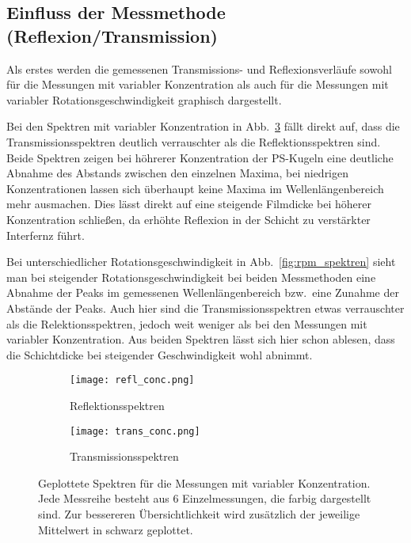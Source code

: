 \subsection{Einfluss der Messmethode (Reflexion/Transmission) \label{sec:einflussmethode}}

Als erstes werden die gemessenen Transmissions- und Reflexionsverläufe sowohl für die Messungen mit variabler Konzentration als auch für die Messungen mit variabler Rotationsgeschwindigkeit graphisch dargestellt. 

Bei den Spektren mit variabler Konzentration in Abb.~\ref{fig:conc_spektren} fällt direkt auf, dass die Transmissionsspektren deutlich verrauschter als die Reflektionsspektren sind. Beide Spektren zeigen bei höhrerer Konzentration der PS-Kugeln eine deutliche Abnahme des Abstands zwischen den einzelnen Maxima, bei niedrigen Konzentrationen lassen sich überhaupt keine Maxima im Wellenlängenbereich mehr ausmachen. Dies lässt direkt auf eine steigende Filmdicke bei höherer Konzentration schließen, da erhöhte Reflexion in der Schicht zu verstärkter Interfernz führt.

Bei unterschiedlicher Rotationsgeschwindigkeit in Abb.~\ref{fig:rpm_spektren} sieht man bei steigender Rotationsgeschwindigkeit bei beiden Messmethoden eine Abnahme der Peaks im gemessenen Wellenlängenbereich bzw.~eine Zunahme der Abstände der Peaks. Auch hier sind die Transmissionsspektren etwas verrauschter als die Relektionsspektren, jedoch weit weniger als bei den Messungen mit variabler Konzentration. Aus beiden Spektren lässt sich hier schon ablesen, dass die Schichtdicke bei steigender Geschwindigkeit wohl abnimmt.

\begin{figure}[h!]
    \centering
    \begin{subfigure}{.5\textwidth}
      \centering
      \texttt{[image: refl\_conc.png]}
      \caption{Reflektionsspektren}
      \label{fig:refl_conc}
    \end{subfigure}%
    \begin{subfigure}{.5\textwidth}
      \centering
      \texttt{[image: trans\_conc.png]}
      \caption{Transmissionsspektren}
      \label{fig:refl_trans}
    \end{subfigure}
    \caption{Geplottete Spektren für die Messungen mit variabler Konzentration. Jede Messreihe besteht aus 6 Einzelmessungen, die farbig dargestellt sind. Zur bessereren Übersichtlichkeit wird zusätzlich der jeweilige Mittelwert in schwarz geplottet.}
    \label{fig:conc_spektren}
\end{figure}

